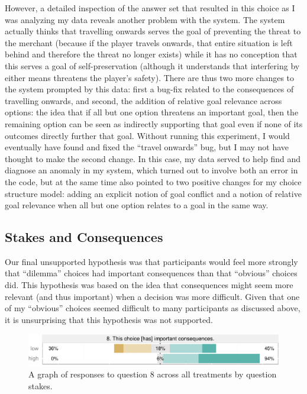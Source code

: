 However, a detailed inspection of the answer set that resulted in this choice as I was analyzing my data reveals another problem with the system.
%
The system actually thinks that travelling onwards serves the goal of preventing the threat to the merchant (because if the player travels onwards, that entire situation is left behind and therefore the threat no longer exists) while it has no conception that this serves a goal of self-preservation (although it understands that interfering by either means threatens the player's safety).
%
There are thus two more changes to the system prompted by this data: first a bug-fix related to the consequences of travelling onwards, and second, the addition of relative goal relevance across options: the idea that if all but one option threatens an important goal, then the remaining option can be seen as indirectly supporting that goal even if none of its outcomes directly further that goal.
%
Without running this experiment, I would eventually have found and fixed the ``travel onwards'' bug, but I may not have thought to make the second change.
%
In this case, my data served to help find and diagnose an anomaly in my system, which turned out to involve both an error in the code, but at the same time also pointed to two positive changes for my choice structure model: adding an explicit notion of goal conflict and a notion of relative goal relevance when all but one option relates to a goal in the same way.

\subsection{Stakes and Consequences}

Our final unsupported hypothesis was that participants would feel more strongly that ``dilemma'' choices had important consequences than that ``obvious'' choices did.
%
This hypothesis was based on the idea that consequences might seem more relevant (and thus important) when a decision was more difficult.
%
Given that one of my ``obvious'' choices seemed difficult to many participants as discussed above, it is unsurprising that this hypothesis was not supported.


\begin{figure}[!h]
  \includegraphics[width=\textwidth]{fig/stakes-q8.pdf}
  \caption{A graph of responses to question 8 across all treatments by question stakes.}
  \label{fig:stakesq8}
\end{figure}



